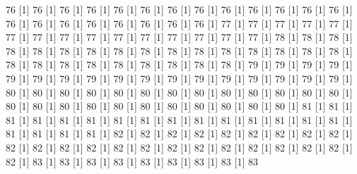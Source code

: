 \documentclass[12pt]{article}
\begin{document}
\begin{Schunk}
\begin{Soutput}
[1] 76%
[1] 76%
[1] 76%
[1] 76%
[1] 76%
[1] 76%
[1] 76%
[1] 76%
[1] 76%
[1] 76%
[1] 76%
[1] 76%
[1] 76%
[1] 76%
[1] 76%
[1] 76%
[1] 76%
[1] 76%
[1] 76%
[1] 76%
[1] 76%
[1] 77%
[1] 77%
[1] 77%
[1] 77%
[1] 77%
[1] 77%
[1] 77%
[1] 77%
[1] 77%
[1] 77%
[1] 77%
[1] 77%
[1] 77%
[1] 77%
[1] 77%
[1] 78%
[1] 78%
[1] 78%
[1] 78%
[1] 78%
[1] 78%
[1] 78%
[1] 78%
[1] 78%
[1] 78%
[1] 78%
[1] 78%
[1] 78%
[1] 78%
[1] 78%
[1] 78%
[1] 78%
[1] 78%
[1] 78%
[1] 78%
[1] 78%
[1] 78%
[1] 78%
[1] 78%
[1] 78%
[1] 79%
[1] 79%
[1] 79%
[1] 79%
[1] 79%
[1] 79%
[1] 79%
[1] 79%
[1] 79%
[1] 79%
[1] 79%
[1] 79%
[1] 79%
[1] 79%
[1] 79%
[1] 79%
[1] 79%
[1] 80%
[1] 80%
[1] 80%
[1] 80%
[1] 80%
[1] 80%
[1] 80%
[1] 80%
[1] 80%
[1] 80%
[1] 80%
[1] 80%
[1] 80%
[1] 80%
[1] 80%
[1] 80%
[1] 80%
[1] 80%
[1] 80%
[1] 80%
[1] 80%
[1] 80%
[1] 80%
[1] 80%
[1] 81%
[1] 81%
[1] 81%
[1] 81%
[1] 81%
[1] 81%
[1] 81%
[1] 81%
[1] 81%
[1] 81%
[1] 81%
[1] 81%
[1] 81%
[1] 81%
[1] 81%
[1] 81%
[1] 81%
[1] 81%
[1] 81%
[1] 82%
[1] 82%
[1] 82%
[1] 82%
[1] 82%
[1] 82%
[1] 82%
[1] 82%
[1] 82%
[1] 82%
[1] 82%
[1] 82%
[1] 82%
[1] 82%
[1] 82%
[1] 82%
[1] 82%
[1] 82%
[1] 82%
[1] 82%
[1] 82%
[1] 82%
[1] 82%
[1] 83%
[1] 83%
[1] 83%
[1] 83%
[1] 83%
[1] 83%
[1] 83%
[1] 83%
[1] 83%

\end{Soutput}
\end{Schunk}
\end{document}

